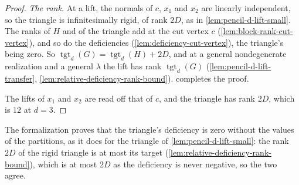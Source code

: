 \begin{proof}
  \emph{The rank.} At a lift, the normals of $c$, $x_1$ and $x_2$ are
  linearly independent, so the triangle is infinitesimally rigid, of rank
  $2D$, as in \cref{lem:pencil-d-lift-small}. The ranks of $H$ and of the
  triangle add at the cut vertex $c$ (\cref{lem:block-rank-cut-vertex}),
  and so do the deficiencies (\cref{lem:deficiency-cut-vertex}), the
  triangle's being zero. So $\operatorname{tgt}_d(G) =
  \operatorname{tgt}_d(H) + 2D$, and at a general nondegenerate
  realization and a general $\lambda$ the lift has rank
  $\operatorname{tgt}_d(G)$ (\cref{lem:pencil-d-lift-transfer},
  \cref{lem:relative-deficiency-rank-bound}).
   completes the proof.

  The lifts of $x_1$ and $x_2$ are read off that of $c$, and the
  triangle has rank $2D$, which is $12$ at $d = 3$.
\end{proof}

\begin{fmlnote}
  The formalization proves that the triangle's deficiency is zero
  without the values of the partitions, as it does for the triangle of
  \cref{lem:pencil-d-lift-small}: the rank $2D$ of the rigid triangle is
  at most its target (\cref{lem:relative-deficiency-rank-bound}), which
  is at most $2D$ as the deficiency is never negative, so the two agree.
\end{fmlnote}

